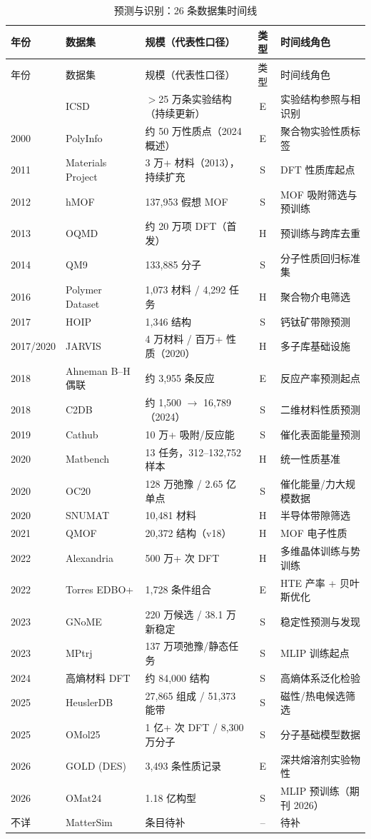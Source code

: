 \documentclass[11pt,a4paper]{ctexart}
\begin{document}
\begin{longtable}{@{}p{1.1cm}p{3.6cm}p{4.3cm}cp{5.4cm}@{}}
\caption{预测与识别：26 条数据集时间线}\\
\toprule
年份 & 数据集 & 规模（代表性口径） & 类型 & 时间线角色 \\
\midrule
\endfirsthead
\toprule
年份 & 数据集 & 规模（代表性口径） & 类型 & 时间线角色 \\
\midrule
\endhead
\bottomrule
\endfoot
1978 & ICSD & $>$25 万条实验结构（持续更新） & E & 实验结构参照与相识别 \\
2000 & PolyInfo & 约 50 万性质点（2024 概述） & E & 聚合物实验性质标签 \\
2011 & Materials Project & 3 万+ 材料（2013），持续扩充 & S & DFT 性质库起点 \\
2012 & hMOF & 137,953 假想 MOF & S & MOF 吸附筛选与预训练 \\
2013 & OQMD & 约 20 万项 DFT（首发） & H & 预训练与跨库去重 \\
2014 & QM9 & 133,885 分子 & S & 分子性质回归标准集 \\
2016 & Polymer Dataset & 1,073 材料 / 4,292 任务 & H & 聚合物介电筛选 \\
2017 & HOIP & 1,346 结构 & S & 钙钛矿带隙预测 \\
2017/2020 & JARVIS & 4 万材料 / 百万+ 性质（2020） & H & 多子库基础设施 \\
2018 & Ahneman B--H 偶联 & 约 3,955 条反应 & E & 反应产率预测起点 \\
2018 & C2DB & 约 1,500 $\to$ 16,789（2024） & S & 二维材料性质预测 \\
2019 & Cathub & 10 万+ 吸附/反应能 & S & 催化表面能量预测 \\
2020 & Matbench & 13 任务，312--132,752 样本 & H & 统一性质基准 \\
2020 & OC20 & 128 万弛豫 / 2.65 亿单点 & S & 催化能量/力大规模数据 \\
2020 & SNUMAT & 10,481 材料 & H & 半导体带隙筛选 \\
2021 & QMOF & 20,372 结构（v18） & H & MOF 电子性质 \\
2022 & Alexandria & 500 万+ 次 DFT & H & 多维晶体训练与势训练 \\
2022 & Torres EDBO+ & 1,728 条件组合 & E & HTE 产率 + 贝叶斯优化 \\
2023 & GNoME & 220 万候选 / 38.1 万新稳定 & S & 稳定性预测与发现 \\
2023 & MPtrj & 137 万项弛豫/静态任务 & S & MLIP 训练起点 \\
2024 & 高熵材料 DFT & 约 84,000 结构 & S & 高熵体系泛化检验 \\
2025 & HeuslerDB & 27,865 组成 / 51,373 能带 & S & 磁性/热电候选筛选 \\
2025 & OMol25 & 1 亿+ 次 DFT / 8,300 万分子 & S & 分子基础模型数据 \\
2026 & GOLD (DES) & 3,493 条性质记录 & E & 深共熔溶剂实验物性 \\
2026 & OMat24 & 1.18 亿构型 & S & MLIP 预训练（期刊 2026） \\
不详 & MatterSim & 条目待补 & -- & 待补 \\
\end{longtable}
\end{document}
